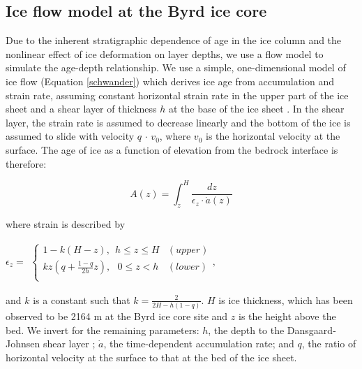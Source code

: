 \subsection{Ice flow model at the Byrd ice core}

Due to the inherent stratigraphic dependence of age in the ice column and the nonlinear effect of ice deformation on layer depths, we use a flow model to simulate the age-depth relationship. We use a simple, one-dimensional model of ice flow (Equation \ref{schwander}) which derives ice age from accumulation and strain rate, assuming constant horizontal strain rate in the upper part of the ice sheet and a shear layer of thickness $h$ at the base of the ice sheet \citep{schwander2001}. In the shear layer, the strain rate is assumed to decrease linearly and the bottom of the ice is assumed to slide with velocity $q$ $\cdot$ $v_0$, where $v_0$ is the horizontal velocity at the surface. The age of ice as a function of elevation from the bedrock interface is therefore:

\begin{equation}\label{schwander}
A(z) = \int_{z}^{H} \frac{dz}{\epsilon_z \cdot \dot{a}(z)}
\end{equation}

\noindent where strain is described by \\

\begin{center}
$    \epsilon_z=
	\begin{aligned}
    \begin{cases}
                 1-k(H-z), \:\:  h \leq z \leq H  & (upper) \\
                  kz(q+\frac{1-q}{2h}z), \:\:\: 0 \leq z < h &(lower) \\
    \end{cases}, 
    \end{aligned}
$
\end{center}
\bigskip

\noindent and $k$ is a constant such that $k = \frac{2}{2H - h(1-q)}$. $H$ is ice thickness, which has been observed to be 2164 m at the Byrd ice core site \citep{gow1968} and $z$ is the height above the bed. We invert for the remaining parameters: $h$, the depth to the Dansgaard-Johnsen shear layer \citep{dansgaardjohnsen1969}; $\dot{a}$, the time-dependent accumulation rate; and $q$, the ratio of horizontal velocity at the surface to that at the bed of the ice sheet.

